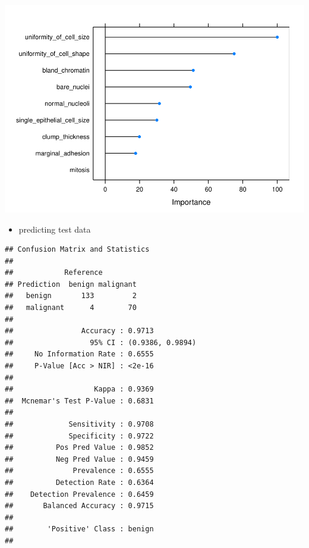 \documentclass[]{article}
\newenvironment{Shaded}{\begin{snugshade}}{\end{snugshade}}
\newcommand{\KeywordTok}[1]{\textcolor[rgb]{0.13,0.29,0.53}{\textbf{{#1}}}}
\newcommand{\NormalTok}[1]{{#1}}
\providecommand{\tightlist}{%
  \setlength{\itemsep}{0pt}\setlength{\parskip}{0pt}}
\begin{document}
\includegraphics{webinar_code_files/figure-latex/unnamed-chunk-11-1.pdf}

\begin{itemize}
\tightlist
\item
  predicting test data
\end{itemize}

\begin{Shaded}
\end{Shaded}

\begin{verbatim}
## Confusion Matrix and Statistics
## 
##            Reference
## Prediction  benign malignant
##   benign       133         2
##   malignant      4        70
##                                           
##                Accuracy : 0.9713          
##                  95% CI : (0.9386, 0.9894)
##     No Information Rate : 0.6555          
##     P-Value [Acc > NIR] : <2e-16          
##                                           
##                   Kappa : 0.9369          
##  Mcnemar's Test P-Value : 0.6831          
##                                           
##             Sensitivity : 0.9708          
##             Specificity : 0.9722          
##          Pos Pred Value : 0.9852          
##          Neg Pred Value : 0.9459          
##              Prevalence : 0.6555          
##          Detection Rate : 0.6364          
##    Detection Prevalence : 0.6459          
##       Balanced Accuracy : 0.9715          
##                                           
##        'Positive' Class : benign          
## 
\end{verbatim}
\end{document}

